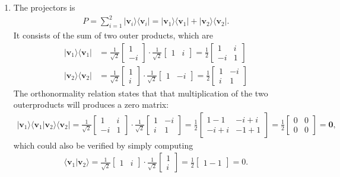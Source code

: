 \documentclass[letterpaper,11pt,twoside]{article}
\newcommand{\ket}[1]{|#1\rangle}
\newcommand{\bra}[1]{\langle#1|}
\newcommand{\braket}[1]{\langle#1\rangle}
\begin{document}
\begin{enumerate}[itemsep=0pt,topsep=0pt,label=\alph*.]
  \item The projectors is 
  \begin{align*}
    P=\sum_{i=1}^2\ket{\bm{v}_i}\bra{\bm{v}_i}=\ket{\bm{v}_1}\bra{\bm{v}_1}+\ket{\bm{v}_2}\bra{\bm{v}_2}.
  \end{align*}
  It consists of the sum of two outer products, which are
  \begin{align*}
    \ket{\bm{v}_1}\bra{\bm{v}_1}&=\frac{1}{\sqrt{2}}\begin{bmatrix}
    1\\-i
    \end{bmatrix}\cdot\frac{1}{\sqrt{2}}\begin{bmatrix}
    1&i
    \end{bmatrix}=\frac{1}{2}\begin{bmatrix}
      1&i\\-i&1
    \end{bmatrix}\\
    \ket{\bm{v}_2}\bra{\bm{v}_2}&=\frac{1}{\sqrt{2}}\begin{bmatrix}
    1\\i
    \end{bmatrix}\cdot\frac{1}{\sqrt{2}}\begin{bmatrix}
    1&-i
    \end{bmatrix}=\frac{1}{2}\begin{bmatrix}
      1&-i\\i&1
    \end{bmatrix}
  \end{align*}
  The orthonormality relation states that that multiplication of the two outerproducts will produces a zero matrix:
  \begin{align*}
    \ket{\bm{v}_1}\braket{\bm{v}_1|\bm{v}_2}\bra{\bm{v}_2}=\frac{1}{\sqrt{2}}\begin{bmatrix}
      1&i\\-i&1
    \end{bmatrix}\cdot\frac{1}{\sqrt{2}}\begin{bmatrix}
      1&-i\\i&1
    \end{bmatrix}=\frac{1}{2}\begin{bmatrix}
      1-1&-i+i\\-i+i&-1+1
    \end{bmatrix}=\frac{1}{2}\begin{bmatrix}
      0&0\\0&0
    \end{bmatrix}=\bm{0},
  \end{align*}
  which could also be verified by simply computing 
  \begin{align*}
    \braket{\bm{v}_1|\bm{v}_2}=\frac{1}{\sqrt{2}}\begin{bmatrix}
    1&i
    \end{bmatrix}\cdot\frac{1}{\sqrt{2}}\begin{bmatrix}
    1\\i
    \end{bmatrix}=\frac{1}{2}\begin{bmatrix}
      1-1
    \end{bmatrix}=0.
  \end{align*}


\end{enumerate}
\end{document}
